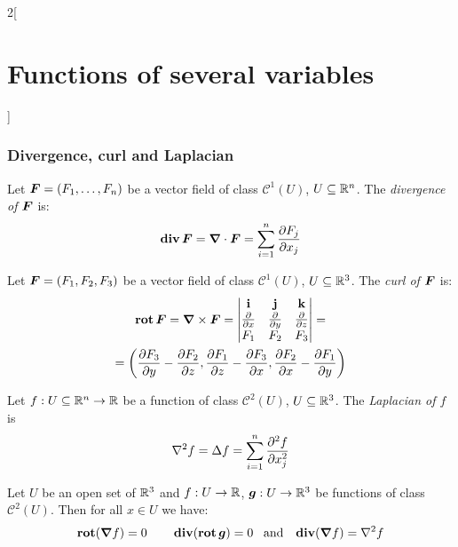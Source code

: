 \documentclass[../../../main.tex]{subfiles}
\begin{document}
\begin{multicols}{2}[\section{Functions of several variables}]
  \subsubsection*{Divergence, curl and Laplacian}
  \begin{definition}
    Let $\boldsymbol{F}=(F_1,\ldots, F_n)$ be a vector field of class $\mathcal{C}^1(U)$, $U\subseteq\mathbb{R}^n$. The \textit{divergence of $\boldsymbol{F}$} is: $$\operatorname{\vb{div}}\boldsymbol{F}=\grad\cdot\boldsymbol{F}=\sum_{i=1}^n\frac{\partial F_j}{\partial x_j}$$
  \end{definition}
  \begin{definition}
    Let $\boldsymbol{F}=(F_1,F_2,F_3)$ be a vector field of class $\mathcal{C}^1(U)$, $U\subseteq\mathbb{R}^3$. The \textit{curl of $\boldsymbol{F}$} is:
    \begin{multline*}
      \operatorname{\vb{rot}}\boldsymbol{F}=\grad\times\boldsymbol{F}=
      \begin{vmatrix}
        \vb{i}               & \vb{j}               & \vb{k}               \\
        \frac{\partial}{\partial x} & \frac{\partial}{\partial y} & \frac{\partial}{\partial z} \\
        F_1                         & F_2                         & F_3                         \\
      \end{vmatrix}=\\=\left(\frac{\partial F_3}{\partial y}-\frac{\partial F_2}{\partial z},\frac{\partial F_1}{\partial z}-\frac{\partial F_3}{\partial x},\frac{\partial F_2}{\partial x}-\frac{\partial F_1}{\partial y}\right)
    \end{multline*}
  \end{definition}
  \begin{definition}
    Let $f:U\subseteq\mathbb{R}^n\rightarrow\mathbb{R} $ be a function of class $\mathcal{C}^2(U)$, $U\subseteq\mathbb{R}^3$. The \textit{Laplacian of $f$} is $$\laplacian f=\Delta f=\sum_{i=1}^n\frac{\partial^2 f}{\partial x_j^2}$$
  \end{definition}
  \begin{prop}
    Let $U$ be an open set of $\mathbb{R}^3$ and $f:U\rightarrow\mathbb{R} $, $\boldsymbol{g}:U\rightarrow\mathbb{R}^3$ be functions of class $\mathcal{C}^2(U)$. Then for all $x\in U$ we have: $$\rot(\grad f)=0\qquad\div(\rot\vectorfunction{g})=0\;\;\;\text{and}\;\;\;\div(\grad f)=\laplacian f$$
  \end{prop}

\end{multicols}
\end{document}
